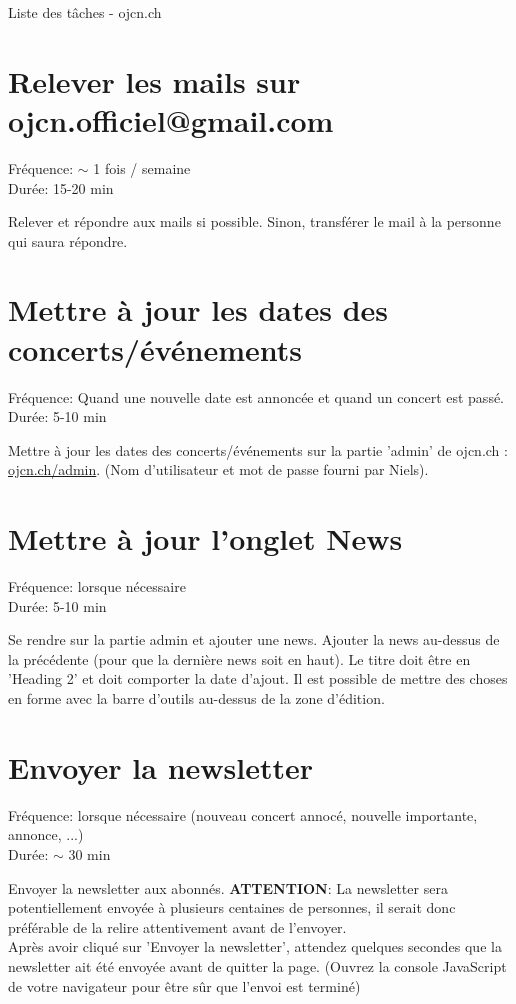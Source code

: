 \documentclass[10pt,a4paper]{article}
\begin{document}
\begin{center}
\begin{Huge}
Liste des tâches - ojcn.ch
\end{Huge}
\end{center}

\section{Relever les mails sur ojcn.officiel@gmail.com}
\begin{center}
Fréquence: $\sim$ 1 fois / semaine \\
Durée: 15-20 min
\end{center}

Relever et répondre aux mails si possible. Sinon, transférer le mail à la personne qui saura répondre.

\section{Mettre à jour les dates des concerts/événements}
\begin{center}
Fréquence: Quand une nouvelle date est annoncée et quand un concert est passé. \\
Durée: 5-10 min
\end{center}

Mettre à jour les dates des concerts/événements sur la partie 'admin' de ojcn.ch : \url{ojcn.ch/admin}. 
(Nom d'utilisateur et mot de passe fourni par Niels).

\section{Mettre à jour l'onglet News}
\begin{center}
Fréquence: lorsque nécessaire \\
Durée: 5-10 min
\end{center}

Se rendre sur la partie admin et ajouter une news. Ajouter la news au-dessus de la précédente (pour que la dernière news soit en haut).
Le titre doit être en 'Heading 2' et doit comporter la date d'ajout. Il est possible de mettre des choses en forme avec la barre d'outils au-dessus de la zone d'édition.

\section{Envoyer la newsletter}
\begin{center}
Fréquence: lorsque nécessaire (nouveau concert annocé, nouvelle importante, annonce, ...) \\
Durée: $\sim$ 30 min
\end{center}

Envoyer la newsletter aux abonnés. \textbf{ATTENTION}: La newsletter sera potentiellement envoyée à plusieurs centaines de personnes, il serait donc
préférable de la relire attentivement avant de l'envoyer. \\
Après avoir cliqué sur 'Envoyer la newsletter', attendez quelques secondes que la newsletter ait été envoyée avant de quitter la page. 
(Ouvrez la console JavaScript de votre navigateur pour être sûr que l'envoi est terminé)
\end{document}
